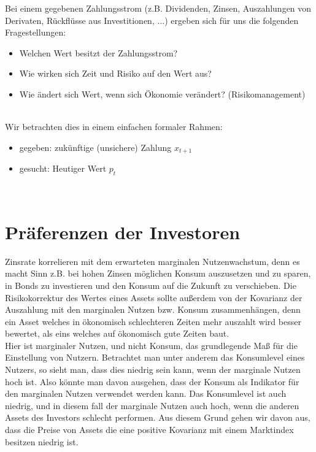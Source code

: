\documentclass[12pt]{extreport} %
\theoremstyle{named}
\theoremstyle{nnamed}
\theoremstyle{itshape}
\theoremstyle{normal}
\begin{document}
Bei einem gegebenen Zahlungsstrom (z.B. Dividenden, Zinsen, Auszahlungen von Derivaten, Rückflüsse aus Investitionen, $\dotsc$) ergeben sich für uns die folgenden Fragestellungen: 
\begin{itemize}
	\item Welchen Wert besitzt der Zahlungsstrom?
	\item Wie wirken sich Zeit und Risiko auf den Wert aus?
	\item Wie ändert sich Wert, wenn sich Ökonomie verändert? (Risikomanagement)
\end{itemize}
~\\
Wir betrachten dies in einem einfachen formaler Rahmen:
\begin{itemize}
	\item gegeben: zukünftige (unsichere) Zahlung $x_{t+1}$
	\item gesucht: Heutiger Wert $p_t$
\end{itemize}

~\newpage

\section{Präferenzen der Investoren}

Zinsrate korrelieren mit dem erwarteten marginalen Nutzenwachstum, denn es macht Sinn z.B. bei hohen Zinsen möglichen Konsum auszusetzen und zu sparen, in Bonds zu investieren und den Konsum auf die Zukunft zu verschieben. Die Risikokorrektur des Wertes eines Assets sollte außerdem von der Kovarianz der Auszahlung mit den marginalen Nutzen bzw. Konsum zusammenhängen, denn ein Asset welches in ökonomisch schlechteren Zeiten mehr auszahlt wird besser bewertet, als eins welches auf ökonomisch gute Zeiten baut. ~\\

Hier ist marginaler Nutzen, und nicht Konsum, das grundlegende Maß für die Einstellung von Nutzern. Betrachtet man unter anderem das Konsumlevel eines Nutzers, so sieht man, dass dies niedrig sein kann, wenn der marginale Nutzen hoch ist. Also könnte man davon ausgehen, dass der Konsum als Indikator für den marginalen Nutzen verwendet werden kann. Das Konsumlevel ist auch niedrig, und in diesem fall der marginale Nutzen auch hoch, wenn die anderen Assets des Investors schlecht performen. Aus diesem Grund gehen wir davon aus, dass die Preise von Assets die eine positive Kovarianz mit einem Marktindex besitzen niedrig ist. ~\\
\end{document}
